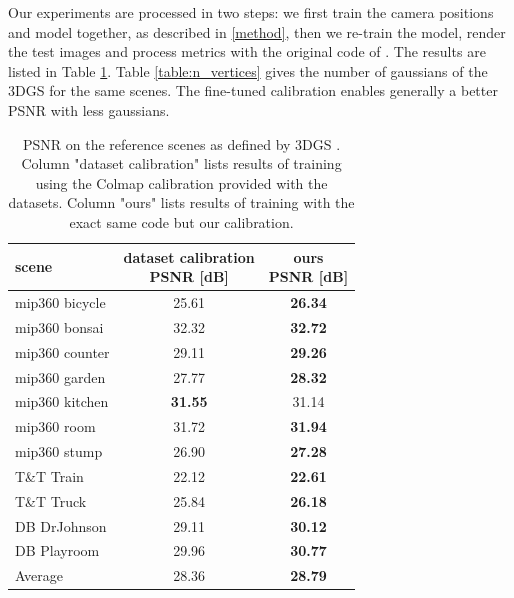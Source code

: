 \documentclass[a4paper,twoside,french]{article}
\begin{document}
Our experiments are processed in two steps: we first train the camera positions and model together, as described in \ref{method},
then we re-train the model, render the test images and process metrics with the original code of \cite{kerbl20233d}.
The results are listed in Table \ref{table:results}. 
Table \ref{table:n_vertices} gives the number of gaussians of the 3DGS \cite{kerbl20233d} for the same scenes.
The fine-tuned calibration enables generally a better PSNR with less gaussians.

\begin{table}[h]
	\begin{center}
		{
		\begin{tabular}{|p{3cm}|c|c|}
			\hline
			scene & \shortstack{dataset calibration \\ PSNR [dB]} & \shortstack{ours \\ PSNR [dB]} \\
			\hline
			mip360 bicycle & 25.61 & \textbf{26.34} \\
			mip360 bonsai & 32.32 & \textbf{32.72} \\
			mip360 counter & 29.11 & \textbf{29.26} \\
			mip360 garden & 27.77 & \textbf{28.32} \\
			mip360 kitchen & \textbf{31.55} & 31.14 \\
			mip360 room & 31.72 & \textbf{31.94} \\
			mip360 stump & 26.90 & \textbf{27.28} \\
			T\&T Train & 22.12 & \textbf{22.61} \\
			T\&T Truck & 25.84 & \textbf{26.18} \\
			DB DrJohnson & 29.11 & \textbf{30.12} \\
			DB Playroom & 29.96 & \textbf{30.77} \\
			\hline
			Average & 28.36 & \textbf{28.79} \\
			\hline
			\end{tabular}
			}
			\caption{PSNR on the reference scenes as defined by 3DGS \cite{kerbl20233d}.
			Column "dataset calibration" lists results of training using the Colmap calibration provided with the datasets.
			Column "ours" lists results of training with the exact same code but our calibration.}
			\label{table:results}
		\end{center}
	\end{table}
	
\end{document}
